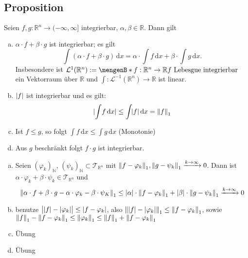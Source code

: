 \subsection[Proposition: Linearität und andere Eigenschaften des Lebesgue-Integrals]{Proposition} %
\label{sub:43}
Seien $f,g : \mathds{R}^n \to (-\infty, \infty]$ integrierbar, $\alpha, \beta \in \mathds{R}$. Dann gilt
\begin{enumerate}[a)]
	\item $\alpha \cdot f + \beta \cdot g$ ist integrierbar; es gilt 
	\[
		\int\! (\alpha \cdot f + \beta \cdot g)  \, \mathrm{d}x  = \alpha \cdot \int\! f  \, \mathrm{d}x + \beta \cdot \int\! g  \, \mathrm{d}x. 
	\]
	Insbesondere ist $\mathcal{L}^{1}(\mathds{R}^n) := \set[f : \mathds{R}^n \to \mathds{R}]{f \text{ Lebesgue integrierbar}} $ ein Vektorraum über $\mathds{R}$ und
	$\int : \mathcal{L}^{-1}(\mathds{R}^n) \to \mathds{R}$ ist linear.
	\item $\lvert f\rvert$ ist integrierbar und es gilt:
	\[
		\abs{\int\! f  \, \mathrm{d}x } \le \int\! \abs{f}  \, \mathrm{d}x   = \norm[1]{f} 
	\]
	\item Ist $f \le g$, so folgt $\int\! f  \, \mathrm{d}x  \le \int\! g  \, \mathrm{d}x $ \hfill(Monotonie)
	\item Aus $g$ beschränkt folgt $f \cdot g$ ist integrierbar.
\end{enumerate}
\begin{enumerate}[a)]
	\item Seien $(\varphi_k)_\mathds{N}$, $(\psi_k)_\mathds{N} \subset \mathcal{T}_{\mathds{R}^n}$ mit 
	$\norm[1]{f- \varphi_k}, \norm[1]{g - \psi_k} \xrightarrow{k \to \infty} 0  $. Dann ist $\alpha \cdot \varphi_k + \beta \cdot \psi_k \in \mathcal{T}_{\mathds{R}^n}$
	und 
	\begin{align*}
		\norm[1]{\alpha \cdot f + \beta \cdot g - \alpha \cdot \varphi_k - \beta \cdot \psi_K}  \le \abs{\alpha} \cdot \norm[1]{f- \varphi_k} + \abs{\beta} \cdot \norm[1]{g- \psi_k} \xrightarrow{k \to \infty} 0    
	\end{align*}
	\item benutze $\big| \lvert f\rvert- \lvert\varphi_k\rvert \big|   \le \lvert f- \varphi_k\rvert $, also $\norm[1]{\abs{f}- \abs{\varphi_k}} \le \norm[1]{f- \varphi_k}$, sowie 
	$\norm[1]{f} - \norm[1]{f- \varphi_k} \le \norm[1]{\varphi_k} \le \norm[1]{f} + \norm[1]{f- \varphi_k}$
	\item Übung
	\item Übung \bewende
\end{enumerate}

